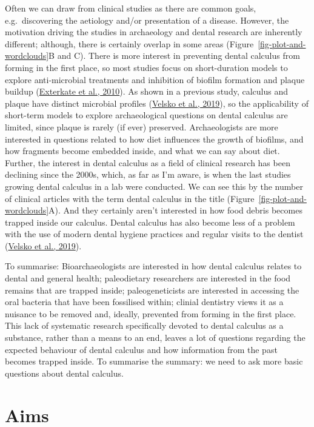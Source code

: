 \documentclass[
  b5paper,
]{book}
\begin{document}
Often we can draw from clinical studies as there are common goals,
e.g.~discovering the aetiology and/or presentation of a disease.
However, the motivation driving the studies in archaeology and dental
research are inherently different; although, there is certainly overlap
in some areas (Figure~\ref{fig-plot-and-wordclouds}B and C). There is
more interest in preventing dental calculus from forming in the first
place, so most studies focus on short-duration models to explore
anti-microbial treatments and inhibition of biofilm formation and plaque
buildup (\protect\hyperlink{ref-extercateAAA2010}{Exterkate et al.,
2010}). As shown in a previous study, calculus and plaque have distinct
microbial profiles
(\protect\hyperlink{ref-velskoMicrobialDifferences2019}{Velsko et al.,
2019}), so the applicability of short-term models to explore
archaeological questions on dental calculus are limited, since plaque is
rarely (if ever) preserved. Archaeologists are more interested in
questions related to how diet influences the growth of biofilms, and how
fragments become embedded inside, and what we can say about diet.
Further, the interest in dental calculus as a field of clinical research
has been declining since the 2000s, which, as far as I'm aware, is when
the last studies growing dental calculus in a lab were conducted. We can
see this by the number of clinical articles with the term dental
calculus in the title (Figure~\ref{fig-plot-and-wordclouds}A). And they
certainly aren't interested in how food debris becomes trapped inside
our calculus. Dental calculus has also become less of a problem with the
use of modern dental hygiene practices and regular visits to the dentist
(\protect\hyperlink{ref-velskoMicrobialDifferences2019}{Velsko et al.,
2019}).

To summarise: Bioarchaeologists are interested in how dental calculus
relates to dental and general health; paleodietary researchers are
interested in the food remains that are trapped inside; paleogeneticists
are interested in accessing the oral bacteria that have been fossilised
within; clinial dentistry views it as a nuisance to be removed and,
ideally, prevented from forming in the first place. This lack of
systematic research specifically devoted to dental calculus as a
substance, rather than a means to an end, leaves a lot of questions
regarding the expected behaviour of dental calculus and how information
from the past becomes trapped inside. To summarise the summary: we need
to ask more basic questions about dental calculus.

\hypertarget{intro-aims}{%
\section{Aims}\label{intro-aims}}
\end{document}
